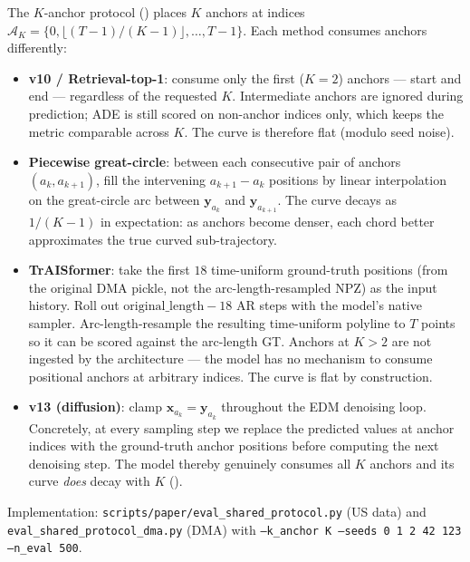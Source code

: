 \documentclass[11pt]{article}
\begin{document}
The $K$-anchor protocol () places $K$ anchors at
indices $\mathcal{A}_K = \{0, \lfloor (T-1)/(K-1) \rfloor, \dots, T-1\}$.
Each method consumes anchors differently:

\begin{itemize}[leftmargin=*]
\item \textbf{v10 / Retrieval-top-1}: consume only the first ($K=2$)
      anchors --- start and end --- regardless of the requested $K$.
      Intermediate anchors are ignored during prediction; ADE is still
      scored on non-anchor indices only, which keeps the metric
      comparable across $K$. The curve is therefore flat (modulo seed
      noise).
\item \textbf{Piecewise great-circle}: between each consecutive pair
      of anchors $(a_k, a_{k+1})$, fill the intervening $a_{k+1} - a_k$
      positions by linear interpolation on the great-circle arc
      between $\mathbf{y}_{a_k}$ and $\mathbf{y}_{a_{k+1}}$. The curve
      decays as $1/(K-1)$ in expectation: as anchors become denser,
      each chord better approximates the true curved sub-trajectory.
\item \textbf{TrAISformer}: take the first $18$ time-uniform ground-truth
      positions (from the original DMA pickle, not the
      arc-length-resampled NPZ) as the input history. Roll out
      $\mathrm{original\_length} - 18$ AR steps with the model's native
      sampler. Arc-length-resample the resulting time-uniform polyline
      to $T$ points so it can be scored against the arc-length GT.
      Anchors at $K>2$ are not ingested by the architecture --- the
      model has no mechanism to consume positional anchors at
      arbitrary indices. The curve is flat by construction.
\item \textbf{v13 (diffusion)}: clamp $\mathbf{x}_{a_k} = \mathbf{y}_{a_k}$
      throughout the EDM denoising loop. Concretely, at every sampling
      step we replace the predicted values at anchor indices with the
      ground-truth anchor positions before computing the next denoising
      step. The model thereby genuinely consumes all $K$ anchors and
      its curve \emph{does} decay with $K$ ().
\end{itemize}

Implementation: \texttt{scripts/paper/eval\_shared\_protocol.py}
(US data) and \texttt{eval\_shared\_protocol\_dma.py} (DMA) with
\texttt{--k\_anchor K --seeds 0 1 2 42 123 --n\_eval 500}.

\end{document}

